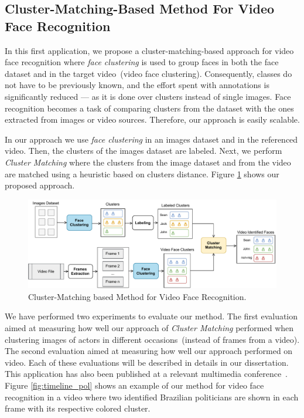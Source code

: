 

\subsection{Cluster-Matching-Based Method For Video Face Recognition}
\label{webmedia}

In this first application, we propose a cluster-matching-based approach for video face recognition where \emph{face clustering} is used to group faces in both the face dataset and in the target video~(video face clustering).
Consequently, classes do not have to be previously known, and the effort spent with annotations is significantly reduced --- as it is done over clusters instead of single images.
Face recognition becomes a task of comparing clusters from the dataset with the ones extracted from images or video sources.
Therefore, our approach is easily scalable.

In our approach we use \emph{face clustering} in an images dataset and in the referenced video. Then, the clusters of the images dataset are labeled. Next, we perform \emph{Cluster Matching} where the clusters from the image dataset and from the video are matched using a heuristic based on clusters distance. Figure \ref{fig:cluster_matching} shows our proposed approach.


\begin{figure}[!ht]
    \centering
    \includegraphics[width=\textwidth]{img/webmedia/cluster_matching_process.pdf}
    \caption{Cluster-Matching based Method for Video Face Recognition.}
    \label{fig:cluster_matching}
\end{figure}

We have performed two experiments to evaluate our method. 
The first evaluation aimed at measuring how well our approach of \emph{Cluster Matching} performed when clustering images of actors in different occasions~(instead of frames from a video). 
The second evaluation aimed at measuring how well our approach performed on video. Each of these evaluations will be described in details in our dissertation. This application has also been published at a relevant multimedia conference~\cite{mendes2020cluster}.
Figure \ref{fig:timeline_pol} shows an example of our method for video face recognition in a video where two identified Brazilian politicians are shown in each frame with its respective colored cluster.

